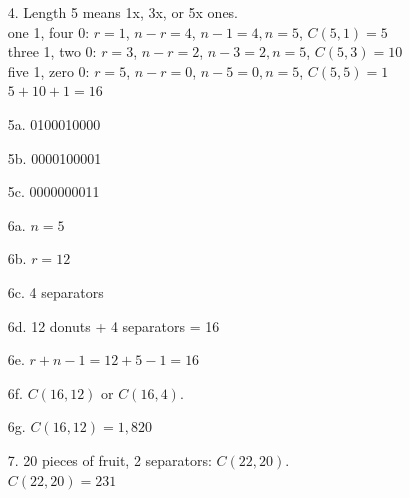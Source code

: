 {\begin{itemize}
        \item[4.]	Length 5 means 1x, 3x, or 5x ones.
					\\ one 1, four 0:	$r = 1$, $n-r = 4$, $n-1=4, n=5$, $C(5,1) = 5$
					\\ three 1, two 0:	$r = 3$, $n-r = 2$, $n-3=2, n=5$, $C(5,3) = 10$
					\\ five 1, zero 0:	$r = 5$, $n-r = 0$, $n-5=0, n=5$, $C(5,5) = 1$
					\\ $5 + 10 + 1 = 16$
		

        \item[5a.]  0100010000
        \item[5b.]  0000100001
        \item[5c.]  0000000011

        \item[6a.]  $n = 5$
        \item[6b.]  $r = 12$
        \item[6c.]  4 separators
        \item[6d.]  12 donuts + 4 separators = 16
        \item[6e.]  $r + n - 1 = 12 + 5 - 1 = 16$
        \item[6f.]  $C(16,12)$ or $C(16,4)$.
        \item[6g.]  $C(16,12) = 1,820$

        \item[7.]   20 pieces of fruit, 2 separators: $C(22,20)$. \\
                    $C(22,20) = 231$
    \end{itemize}
}


